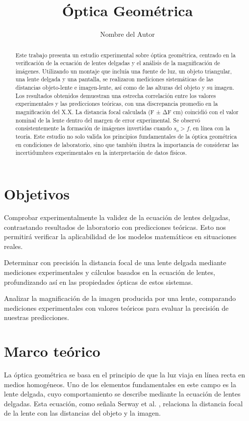 \documentclass[twocolumn,a4paper,11pt]{scrartcl}
\title{Óptica Geométrica}
\author{Nombre del Autor}
\date{}
\begin{document}
\maketitle

\begin{abstract}
Este trabajo presenta un estudio experimental sobre óptica geométrica, centrado en la verificación de la ecuación de lentes delgadas y el análisis de la magnificación de imágenes. Utilizando un montaje que incluía una fuente de luz, un objeto triangular, una lente delgada y una pantalla, se realizaron mediciones sistemáticas de las distancias objeto-lente e imagen-lente, así como de las alturas del objeto y su imagen. Los resultados obtenidos demuestran una estrecha correlación entre los valores experimentales y las predicciones teóricas, con una discrepancia promedio en la magnificación del X.X. La distancia focal calculada (F ± ΔF cm) coincidió con el valor nominal de la lente dentro del margen de error experimental. Se observó consistentemente la formación de imágenes invertidas cuando $s_o > f$, en línea con la teoría. Este estudio no solo valida los principios fundamentales de la óptica geométrica en condiciones de laboratorio, sino que también ilustra la importancia de considerar las incertidumbres experimentales en la interpretación de datos físicos.
\end{abstract}

\section{Objetivos}

Comprobar experimentalmente la validez de la ecuación de lentes delgadas, contrastando resultados de laboratorio con predicciones teóricas. Esto nos permitirá verificar la aplicabilidad de los modelos matemáticos en situaciones reales.

Determinar con precisión la distancia focal de una lente delgada mediante mediciones experimentales y cálculos basados en la ecuación de lentes, profundizando así en las propiedades ópticas de estos sistemas.

Analizar la magnificación de la imagen producida por una lente, comparando mediciones experimentales con valores teóricos para evaluar la precisión de nuestras predicciones.


\section{Marco teórico}
La óptica geométrica se basa en el principio de que la luz viaja en línea recta en medios homogéneos. Uno de los elementos fundamentales en este campo es la lente delgada, cuyo comportamiento se describe mediante la ecuación de lentes delgadas. Esta ecuación, como señala Serway et al. \cite{serway}, relaciona la distancia focal de la lente con las distancias del objeto y la imagen.
\end{document}
